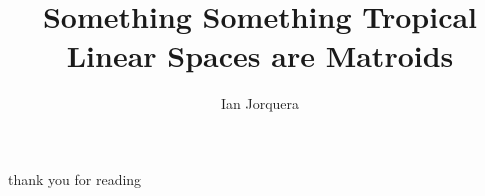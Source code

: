 \documentclass{article}
\title{Something Something Tropical Linear Spaces are Matroids}
\author{Ian Jorquera}
\begin{document}
\maketitle



thank you for reading
\nocite{*}


\end{document}
